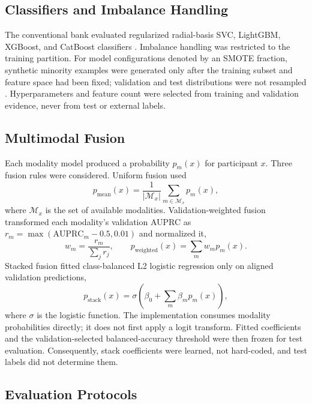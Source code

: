 \subsection{Classifiers and Imbalance Handling}

The conventional bank evaluated regularized radial-basis SVC, LightGBM,
XGBoost, and CatBoost classifiers
\cite{cortes1995svm,ke2017lightgbm,chen2016xgboost,prokhorenkova2018catboost}.
Imbalance handling was restricted to the
training partition. For model configurations denoted by an SMOTE fraction,
synthetic minority examples were generated only after the training subset and
feature space had been fixed; validation and test distributions were not
resampled \cite{chawla2002smote}. Hyperparameters and feature count were selected from training and
validation evidence, never from test or external labels.

\subsection{Multimodal Fusion}

Each modality model produced a probability $p_m(x)$ for participant $x$. Three
fusion rules were considered. Uniform fusion used
\begin{equation}
    p_{\mathrm{mean}}(x)=\frac{1}{|\mathcal{M}_x|}
    \sum_{m\in\mathcal{M}_x}p_m(x),
\end{equation}
where $\mathcal{M}_x$ is the set of available modalities. Validation-weighted
fusion transformed each modality's validation AUPRC as
$r_m=\max(\mathrm{AUPRC}_m-0.5,0.01)$ and normalized it,
\begin{equation}
    w_m=\frac{r_m}{\sum_j r_j},\qquad
    p_{\mathrm{weighted}}(x)=\sum_m w_m p_m(x).
\end{equation}
Stacked fusion fitted class-balanced L2 logistic regression only on aligned
validation predictions,
\begin{equation}
    p_{\mathrm{stack}}(x)
    =\sigma\!\left(\beta_0+\sum_m\beta_m p_m(x)\right),
\end{equation}
where $\sigma$ is the logistic function. The implementation consumes modality
probabilities directly; it does not first apply a logit transform. Fitted
coefficients and the validation-selected balanced-accuracy threshold were then
frozen for test evaluation. Consequently, stack coefficients were learned,
not hard-coded, and test labels did not determine them.

\subsection{Evaluation Protocols}

